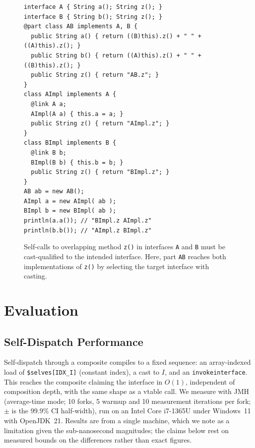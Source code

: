 \documentclass[acmsmall,screen,review,anonymous]{acmart}
\theoremstyle{acmplain}
\newcommand{\code}[1]{\texttt{#1}}
\begin{document}
\begin{figure}[H]
\begin{lstlisting}
interface A { String a(); String z(); }
interface B { String b(); String z(); }
@part class AB implements A, B {
  public String a() { return ((B)this).z() + " " + ((A)this).z(); }
  public String b() { return ((A)this).z() + " " + ((B)this).z(); }
  public String z() { return "AB.z"; }
}
class AImpl implements A {
  @link A a;
  AImpl(A a) { this.a = a; }
  public String z() { return "AImpl.z"; }
}
class BImpl implements B {
  @link B b;
  BImpl(B b) { this.b = b; }
  public String z() { return "BImpl.z"; }
}
AB ab = new AB();
AImpl a = new AImpl( ab );
BImpl b = new BImpl( ab );
println(a.a()); // "BImpl.z AImpl.z"
println(b.b()); // "AImpl.z BImpl.z"
\end{lstlisting}
\caption{Self-calls to overlapping method \code{z()} in interfaces \code{A} and \code{B} must be cast-qualified to the intended
interface. Here, part \code{AB} reaches both implementations of \code{z()} by selecting the target interface with casting.}
\label{fig:overlapCall-listing}
\end{figure}

\section{Evaluation}
\label{sec:eval}

\subsection{Self-Dispatch Performance}

Self-dispatch through a composite compiles to a fixed sequence: an array-indexed
load of \code{\$selves[IDX\_I]} (constant index), a cast to $I$, and an
\code{invokeinterface}. This reaches the composite claiming the interface in
$O(1)$, independent of composition depth, with the same shape as a vtable call.
We measure with JMH~\cite{jmh} (average-time mode; 10 forks, 5 warmup and 10
measurement iterations per fork; $\pm$ is the 99.9\% CI half-width), run on an
Intel Core i7-1365U under Windows~11 with OpenJDK~21. Results are from a single
machine, which we note as a limitation given the sub-nanosecond magnitudes; the
claims below rest on measured bounds on the differences rather than exact
figures.
\end{document}
